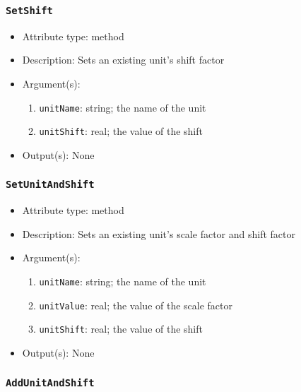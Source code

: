 \documentclass[]{article}
\begin{document}
\subsubsection{\texttt{SetShift}}

\begin{itemize}
	\item Attribute type: method
	\item Description: Sets an existing unit's shift factor
	\item Argument(s):
	\begin{enumerate}
		\item \texttt{unitName}: string; the name of the unit
		\item \texttt{unitShift}: real; the value of the shift
	\end{enumerate}
	\item Output(s): None
\end{itemize}

\subsubsection{\texttt{SetUnitAndShift}}

\begin{itemize}
	\item Attribute type: method
	\item Description: Sets an existing unit's scale factor and shift factor
	\item Argument(s):
	\begin{enumerate}
		\item \texttt{unitName}: string; the name of the unit
		\item \texttt{unitValue}: real; the value of the scale factor
		\item \texttt{unitShift}: real; the value of the shift
	\end{enumerate}
	\item Output(s): None
\end{itemize}


\subsubsection{\texttt{AddUnitAndShift}}
\end{document}
